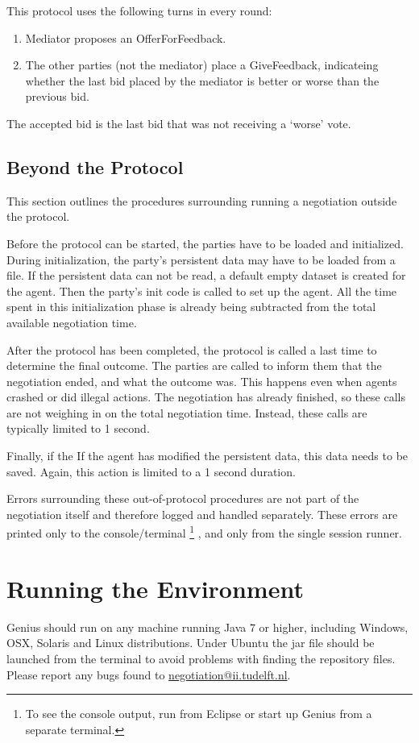 \documentclass[]{article}
\begin{document}
This protocol uses the following turns in every round:
\begin{enumerate}
\item Mediator proposes an OfferForFeedback. 
\item The other parties (not the mediator) place a GiveFeedback,  indicateing whether the last bid placed by the mediator is better or worse than the previous bid.
\end{enumerate}

The accepted bid is the last bid that was not receiving a `worse' vote. 

\subsection{Beyond the Protocol}
This section outlines the procedures surrounding running a negotiation outside the protocol.

Before the protocol can be started, the parties have to be loaded and initialized. During initialization, the party's persistent data may have to be loaded from a file. If the persistent data can not be read, a default empty dataset is created for the agent. Then the party's init code is called to set up the agent. All the time spent in this initialization phase is already being subtracted from the total available negotiation time.

After the protocol has been completed, the protocol is called a last time to determine the final outcome. 
The parties are called to inform them that the negotiation ended, and what the outcome was. This happens even when agents crashed or did illegal actions. The negotiation has already finished, so these calls are not weighing in on the total negotiation time. Instead, these calls are typically limited to 1 second. 

Finally, if the If the agent has modified the persistent data, this data needs to be saved. Again, this action is limited to a 1 second duration.

Errors surrounding these out-of-protocol procedures are not part of the negotiation itself and therefore logged and handled separately. These errors are printed only to the console/terminal \footnote{To see the console output, run from Eclipse or start up Genius from a separate terminal. }
, and only from the single session runner.


\section{Running the Environment}
Genius should run on any machine running Java 7 or higher, including Windows, OSX, Solaris and Linux distributions. Under Ubuntu the jar file should be launched from the terminal to avoid problems with finding the repository files. Please report any bugs found to \url{negotiation@ii.tudelft.nl}.
\end{document}
